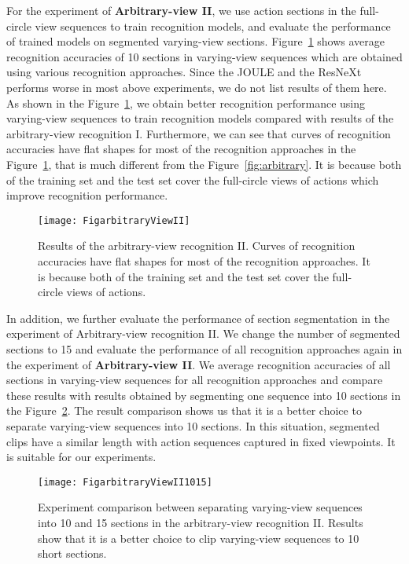 \documentclass[journal]{IEEEtran}
\begin{document}
For the experiment of \textbf{Arbitrary-view II}, we use action sections in the full-circle view sequences to train recognition models, and evaluate the performance of trained models on segmented varying-view sections. Figure~\ref{fig:arbitraryII} shows average recognition accuracies of 10 sections in varying-view sequences which are obtained using various recognition approaches. Since the JOULE and the ResNeXt performs worse in most above experiments, we do not list results of them here. As shown in the Figure~\ref{fig:arbitraryII}, we obtain better recognition performance using varying-view sequences to train recognition models compared with results of the arbitrary-view recognition I. Furthermore, we can see that curves of recognition accuracies have flat shapes for most of the recognition approaches in the Figure~\ref{fig:arbitraryII}, that is much different from the Figure~\ref{fig:arbitrary}. It is because both of the training set and the test set cover the full-circle views of actions which improve recognition performance.
\begin{figure}[t]
\begin{center}
\texttt{[image: FigarbitraryViewII]}
\end{center}
   \caption{Results of the arbitrary-view recognition II. Curves of recognition accuracies have flat shapes for most of the recognition approaches. It is because both of the training set and the test set cover the full-circle views of actions.}
\label{fig:arbitraryII}
\end{figure}

In addition, we further evaluate the performance of section segmentation in the experiment of Arbitrary-view recognition II. We change the number of segmented sections to 15 and evaluate the performance of all recognition approaches again in the experiment of \textbf{Arbitrary-view II}. We average recognition accuracies of all sections in varying-view sequences for all recognition approaches and compare these results with results obtained by segmenting one sequence into 10 sections in the Figure~\ref{fig:arbitraryII1015}. The result comparison shows us that it is a better choice to separate varying-view sequences into 10 sections. In this situation, segmented clips have a similar length with action sequences captured in fixed viewpoints. It is suitable for our experiments.

\begin{figure}[t]
\begin{center}
\texttt{[image: FigarbitraryViewII1015]}
\end{center}
   \caption{Experiment comparison between separating varying-view sequences into 10 and 15 sections in the arbitrary-view recognition II. Results show that it is a better choice to clip varying-view sequences to 10 short sections.}
\label{fig:arbitraryII1015}
\end{figure}
\end{document}
